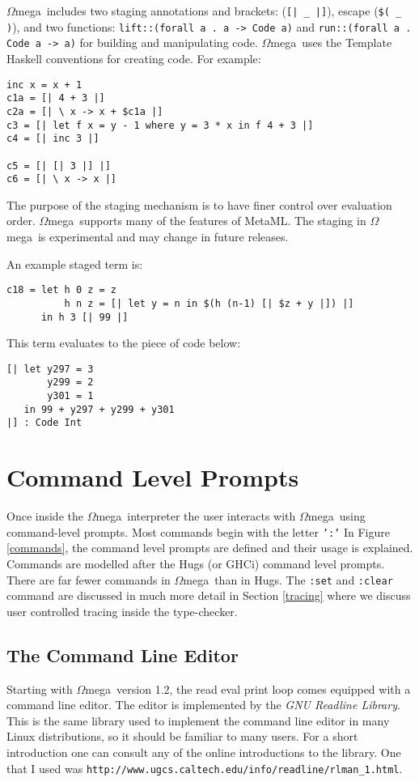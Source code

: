 \documentclass[11pt,twoside]{article}
\newcommand{\om}{$\Omega$mega}
\begin{document}
\om\ includes two staging annotations and brackets: (\verb+[| _ |]+),
escape (\verb+$( _ )+), and two functions:
{\tt lift::(forall a . a -> Code a)} and {\tt run::(forall a . Code a -> a)}
for building and manipulating code. \om\ uses
the Template Haskell\cite{Sheard02} conventions for creating code. For example:
\begin{verbatim}
inc x = x + 1
c1a = [| 4 + 3 |]
c2a = [| \ x -> x + $c1a |]
c3 = [| let f x = y - 1 where y = 3 * x in f 4 + 3 |]
c4 = [| inc 3 |]

c5 = [| [| 3 |] |]
c6 = [| \ x -> x |]
\end{verbatim}

The purpose of the staging mechanism is to have finer control over
evaluation order. \om\ supports many of the features of
MetaML\cite{Sheard:1999:UMS,TS00}. The staging in \om\ is experimental and
may change in future releases.

An example staged term is:
\begin{verbatim}
c18 = let h 0 z = z
          h n z = [| let y = n in $(h (n-1) [| $z + y |]) |]
      in h 3 [| 99 |]
\end{verbatim}
This term evaluates to the piece of code below:
\begin{verbatim}
[| let y297 = 3
       y299 = 2
       y301 = 1
   in 99 + y297 + y299 + y301
|] : Code Int
\end{verbatim}

\section{Command Level Prompts}  \label{command}



Once inside the \om\ interpreter the user interacts
with \om\ using command-level prompts. Most
commands begin with the letter {\tt ':'}
In Figure \ref{commands}, the command level prompts are defined and their
usage is explained. Commands are modelled after the Hugs (or GHCi) command
level prompts. There are far fewer commands in \om\ than in Hugs.
The {\tt :set} and {\tt :clear} command are discussed
in much more detail in Section \ref{tracing} where we discuss
user controlled tracing inside the type-checker.

\subsection{The Command Line Editor}
Starting with \om\ version 1.2, the read eval print loop comes
equipped with a command line editor. The editor is implemented
by the {\em GNU Readline Library}. This is the same
library used to implement the command line editor
in many Linux distributions, so it should be familiar to
many users. For a short introduction
one can consult any of the online introductions
to the library. One that I used
was \verb+http://www.ugcs.caltech.edu/info/readline/rlman_1.html+.
\end{document}
